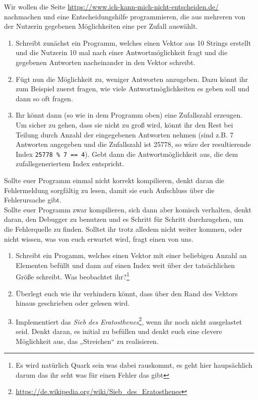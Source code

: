 \begin{praxis}

	Wir wollen die Seite \url{https://www.ich-kann-mich-nicht-entscheiden.de/} nachmachen und eine Entscheidungshilfe programmieren, die aus mehreren von der Nutzerin gegebenen Möglichkeiten eine per Zufall auswählt.

	\begin{enumerate}
		\item
		      Schreibt zunächst ein Programm, welches einen Vektor aus 10 Strings erstellt und die Nutzerin 10 mal nach einer Antwortmöglichkeit fragt und die gegebenen Antworten nacheinander in den Vektor schreibt.
		\item
		      Fügt nun die Möglichkeit zu, weniger Antworten anzugeben.
		      Dazu könnt ihr zum Beispiel zuerst fragen, wie viele Antwortmöglichkeiten es geben soll und dann so oft fragen.
		\item
		      Ihr könnt dann (so wie in dem Programm oben) eine Zufallszahl erzeugen.
		      Um sicher zu gehen, dass sie nicht zu groß wird, könnt ihr den Rest bei Teilung durch Anzahl der eingegebenen Antworten nehmen (sind z.B. 7 Antworten angegeben und die Zufallszahl ist 25778, so wäre der resultierende Index \texttt{25778 \% 7 == 4}).
		      Gebt dann die Antwortmöglichkeit aus, die dem zufallsgeneriertem Index entspricht.
	\end{enumerate}
\end{praxis}

Sollte euer Programm einmal nicht korrekt kompilieren, denkt daran die Fehlermeldung sorgfältig zu lesen, damit sie euch Aufschluss über die Fehlerursache gibt.\\
Sollte euer Programm zwar kompilieren, sich dann aber komisch verhalten, denkt daran, den Debugger zu benutzen und es Schritt für Schritt durchzugehen, um die Fehlerquelle zu finden. Solltet ihr trotz alledem nicht weiter kommen, oder nicht wissen, was von euch erwartet wird, fragt einen von uns.


\begin{spiel}
	\begin{enumerate}
		\item
		      Schreibt ein Progamm, welches einen Vektor mit einer beliebigen Anzahl an Elementen befüllt und dann auf einen Index weit über der tatsächlichen Größe schreibt.
		      Was beobachtet ihr?\footnote{Es wird natürlich Quark sein was dabei rauskommt, es geht hier haupsächlich darum das ihr seht was für einen Fehler das gibt}
		\item
		      Überlegt euch wie ihr verhindern könnt, dass über den Rand des Vektors hinaus geschrieben oder gelesen wird.
		\item
		      Implementiert das \emph{Sieb des Eratosthenes}\footnote{\url{https://de.wikipedia.org/wiki/Sieb_des_Eratosthenes}}, wenn ihr noch nicht ausgelastet seid.
		      Denkt daran, es initial zu befüllen und denkt euch eine clevere Möglichkeit aus, das „Streichen“ zu realisieren.
	\end{enumerate}
\end{spiel}

